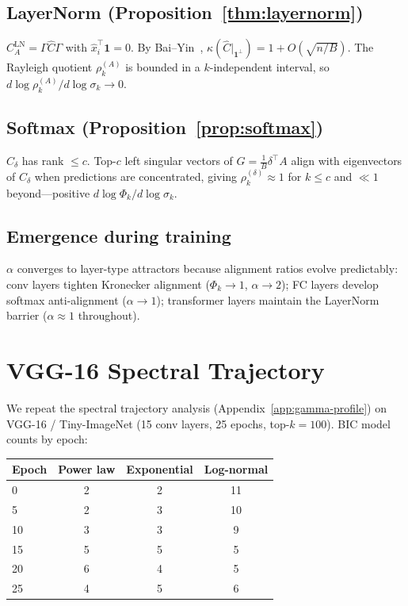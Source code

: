 \documentclass{article}
\begin{document}
\subsection{LayerNorm (Proposition~\ref{thm:layernorm})}
$C_A^{\mathrm{LN}} = \Gamma \hat{C} \Gamma$ with $\hat{x}_i^\top \mathbf{1} = 0$. By Bai--Yin~\cite{baiyin1993}, $\kappa(\hat{C}|_{\mathbf{1}^\perp}) = 1 + O(\sqrt{n/B})$. The Rayleigh quotient $\rho_k^{(A)}$ is bounded in a $k$-independent interval, so $d\log\rho_k^{(A)}/d\log\sigma_k \to 0$.

\subsection{Softmax (Proposition~\ref{prop:softmax})}
$C_\delta$ has rank $\leq c$. Top-$c$ left singular vectors of $G = \frac{1}{B}\delta^\top A$ align with eigenvectors of $C_\delta$ when predictions are concentrated, giving $\rho_k^{(\delta)} \approx 1$ for $k \leq c$ and $\ll 1$ beyond---positive $d\log\Phi_k/d\log\sigma_k$.

\subsection{Emergence during training}
$\alpha$ converges to layer-type attractors because alignment ratios evolve predictably: conv layers tighten Kronecker alignment ($\Phi_k \to 1$, $\alpha \to 2$); FC layers develop softmax anti-alignment ($\alpha \to 1$); transformer layers maintain the LayerNorm barrier ($\alpha \approx 1$ throughout).

\section{VGG-16 Spectral Trajectory}\label{app:vgg-trajectory}

We repeat the spectral trajectory analysis (Appendix~\ref{app:gamma-profile}) on VGG-16 / Tiny-ImageNet (15 conv layers, 25 epochs, top-$k{=}100$). BIC model counts by epoch:

\begin{center}
\small
\begin{tabular}{lccc}
\toprule
Epoch & Power law & Exponential & Log-normal \\
\midrule
0 & 2 & 2 & 11 \\
5 & 2 & 3 & 10 \\
10 & 3 & 3 & 9 \\
15 & 5 & 5 & 5 \\
20 & 6 & 4 & 5 \\
25 & 4 & 5 & 6 \\
\bottomrule
\end{tabular}
\end{center}
\end{document}
